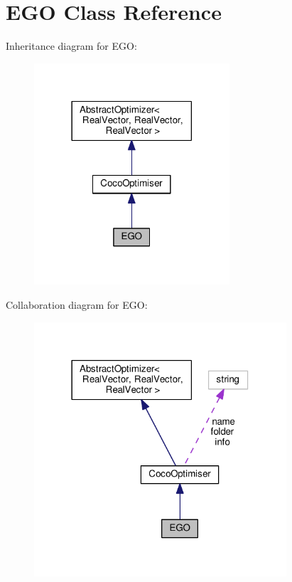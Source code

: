 \hypertarget{classEGO}{}\section{E\+GO Class Reference}
\label{classEGO}


Inheritance diagram for E\+GO\+:\nopagebreak
\begin{figure}[H]
\begin{center}
\leavevmode
\includegraphics[width=206pt]{classEGO__inherit__graph}
\end{center}
\end{figure}


Collaboration diagram for E\+GO\+:\nopagebreak
\begin{figure}[H]
\begin{center}
\leavevmode
\includegraphics[width=266pt]{classEGO__coll__graph}
\end{center}
\end{figure}
